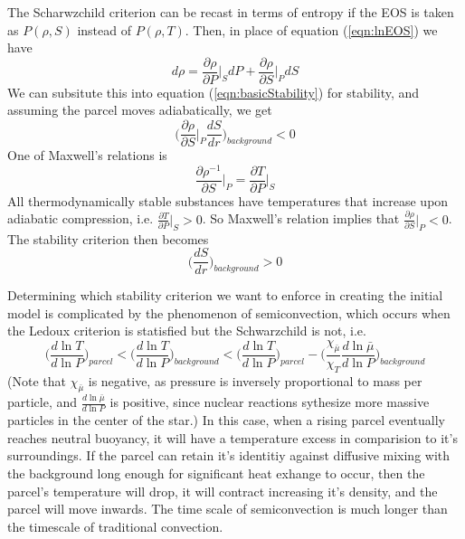\begin{enumerate}
The Scharwzchild criterion can be recast in terms of entropy if 
the EOS is taken as $P(\rho, S)$ instead of $P(\rho, T)$.  Then, in place 
of equation (\ref{eqn:lnEOS}) we have 
\begin{equation}
 d \rho = \frac{\partial \rho}{\partial P} \bigg |_{S} d P + \frac{\partial \rho}{\partial S} \bigg |_{P} dS
\end{equation}
We can subsitute this into equation (\ref{eqn:basicStability}) for stability, 
and assuming the parcel moves adiabatically, we get 
\begin{equation}
  \bigg ( \frac{\partial \rho}{\partial S} \bigg |_{P} \frac{dS}{dr} 
  \bigg )_{background}< 0
\end{equation}
One of Maxwell's relations is 
\begin{equation}
\frac{\partial \rho^{-1}}{\partial S} \bigg |_{P} = \frac{\partial T}{\partial P} \bigg |_{S}
\end{equation}
All thermodynamically stable substances have temperatures that increase upon 
adiabatic compression, i.e. $\frac{\partial T}{\partial P} \big |_{S} > 0$.
So Maxwell's relation implies that 
$\frac{\partial \rho}{\partial S} \big |_{P} < 0$.
The stability criterion then becomes
\begin{equation}
 \bigg ( \frac{d S}{d r} \bigg )_{background} > 0 
\label{eqn:stabilityEntr}
\end{equation}
%
\end{enumerate}

Determining which stability criterion we want to enforce in creating the 
initial model is complicated by the phenomenon of semiconvection, which  
occurs when the Ledoux criterion is statisfied but the Schwarzchild is not, 
i.e.
\begin{equation}
  \bigg (  \frac{d \ln T}{d \ln P} \bigg )_{parcel} < 
  \bigg (  \frac{d \ln T}{d \ln P} \bigg )_{background} <
  \bigg (  \frac{d \ln T}{d \ln P} \bigg )_{parcel} - 
  \bigg ( \frac{\chi_{\bar{\mu}}}{\chi_T} 
  \frac{d \ln \bar{\mu}}{d \ln P} \bigg )_{background}
\end{equation}
(Note that $\chi_{\bar{\mu}}$ is negative, as pressure is inversely proportional 
to mass per particle, and $\frac{d \ln \bar{\mu}}{d \ln P}$ is positive, since
nuclear reactions sythesize more massive particles in the center of the star.) 
In this case, when a rising parcel eventually reaches neutral buoyancy, it will
have a temperature excess in comparision to it's surroundings.  
If the parcel can retain
it's identitiy against diffusive mixing with the background long enough for 
significant heat exhange to occur, then the parcel's temperature will drop, it 
will contract increasing it's density, and the parcel will move inwards.
The time scale of semiconvection is much longer than the timescale of 
traditional convection.

